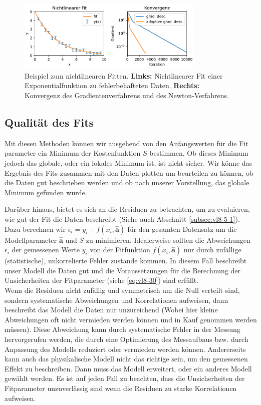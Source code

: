 \begin{figure}[tbp]
    \centering
        \includegraphics[width=0.8\textwidth]{Figures/nonlinear_fitting_image.pdf}
        \caption{Beispiel zum nichtlinearen Fitten. \textbf{Links:} Nichtlinearer Fit einer Exponentialfunktion zu fehlerbehafteten Daten. \textbf{Rechts:} Konvergenz des Gradientenverfahrens und des Newton-Verfahrens.  }
        \label{fig:nonlinearFit}
\end{figure} 

\subsection{Qualität des Fits}
\label{subsec:vl9-3}

Mit diesen Methoden können wir ausgehend von den Anfangswerten für die Fit parameter ein Minimum der Kostenfunktion $S$ bestimmen. Ob dieses Minimum jedoch das globale, oder ein lokales Minimum ist, ist nicht sicher. Wir könne das Ergebnis des Fits zusammen mit den Daten plotten um beurteilen zu können, ob die Daten gut beschrieben werden und ob nach unserer Vorstellung, das globale Minimum gefunden wurde.

Darüber hinaus, bietet es sich an die Residuen zu betrachten, um zu evaluieren, wie gut der Fit die Daten beschreibt (Siehe auch Abschnitt \ref{subsec:vl8-5-1}). Dazu berechnen wir $\epsilon_i =y_i - f(x_i, \boldsymbol{\hat{a}})$ für den gesamten Datensatz um die Modellparameter $\boldsymbol{\hat{a}}$ und $S$ zu minimieren. Idealerweise sollten die Abweichungen $\epsilon_i$ der gemessenen Werte $y_i$ von der Fitfunktion $f(x_i, \boldsymbol{\hat{a}})$ nur durch zufällige (statistische), unkorrelierte Fehler zustande kommen. In diesem Fall beschreibt unser Modell die Daten gut und die Voraussetzungen für die Berechnung der Unsicherheiten der Fitparameter (siehe \cref{eq:vl8-30}) sind erfüllt.\\
Wenn die Residuen nicht zufällig und symmetrisch um die Null verteilt sind, sondern systematische Abweichungen und Korrelationen aufweisen, dann beschreibt das Modell die Daten nur unzureichend (Wobei hier kleine Abweichungen oft nicht vermieden werden können und in Kauf genommen werden müssen). Diese Abweichung kann durch systematische Fehler in der Messung hervorgerufen werden, die durch eine Optimierung des Messaufbaus bzw. durch Anpassung des Modells reduziert oder vermieden werden können. Andererseits kann auch das physikalische Modell nicht das richtige sein, um den gemessenen Effekt zu beschreiben. Dann muss das Modell erweitert, oder ein anderes Modell gewählt werden. Es ist auf jeden Fall zu beachten, dass die Unsicherheiten der Fitparameter unzuverlässig sind wenn die Residuen zu starke Korrelationen aufweisen.



